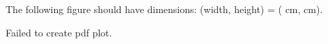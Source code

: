 \documentclass[12pt]{pylatex}
\begin{document}
The following figure should have dimensions: (width, height) = ( cm,  cm).

\vspace{10pt}

\begin{minipage}{\textwidth}
   \centering
   {}{Failed to create pdf plot.}
\end{minipage}
\end{document}
